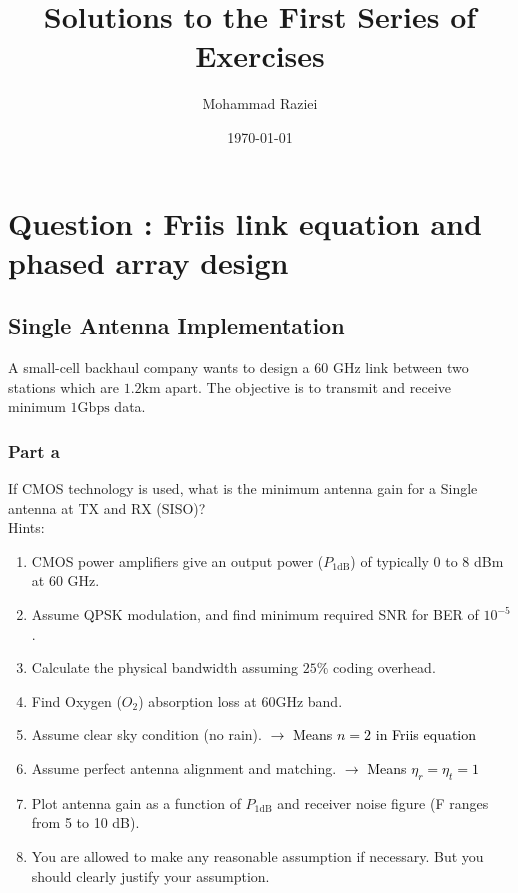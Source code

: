 \documentclass[12pt,onecolumn,a4paper]{article}
\author{Mohammad Raziei}
\title{Solutions to the First Series of Exercises}
\date{\today}
\newcommand\question[1][\space]{
	\section[Question \numberstringnum{\thesection}]
	{Question \numberstringnum{\thesection}: #1}
}
\begin{document}
	
	
	\pagestyle{fancy}
	\maketitle
	
	
	\FloatBarrier\question[Friis link equation and phased array design]%
	
	\subsection{Single Antenna Implementation}\label{SISO}
	\textcolor{questioncolor}{A small-cell backhaul company wants to design a 60 GHz link between two stations which are
		$1.2 \text{km}$ apart. The objective is to transmit and receive minimum $1 \text{Gbps}$ data.}
	
	\subsubsection{Part a}
	{\color{questioncolor} If CMOS technology is used, what is the minimum antenna gain for a Single antenna at TX
	and RX (SISO)?
	\\[1em]
	\noindent Hints:
	\begin{enumerate}
		\item CMOS power amplifiers give an output power ($P_{1\text{dB}}$) of typically 0 to 8 dBm at 60 GHz. 
		\item Assume QPSK modulation, and find minimum required SNR for BER of $10^{-5}$. 
		\item Calculate the physical bandwidth assuming $25\%$ coding overhead.
		\item Find Oxygen ($O_2$) absorption loss at $60 \text{GHz}$ band.
		\item Assume clear sky condition (no rain). \textcolor{black}{$\rightarrow$ Means \(n = 2\) in Friis equation}
		\item Assume perfect antenna alignment and matching.  \textcolor{black}{$\rightarrow$ Means \(\eta_r = \eta_t = 1\) }
		\item Plot antenna gain as a function of $P_{1\text{dB}}$ and receiver noise figure (F ranges from 5 to 10 dB).
		\item You are allowed to make any reasonable assumption if necessary. But you should clearly justify your assumption.	
	\end{enumerate}
	}
\end{document}
